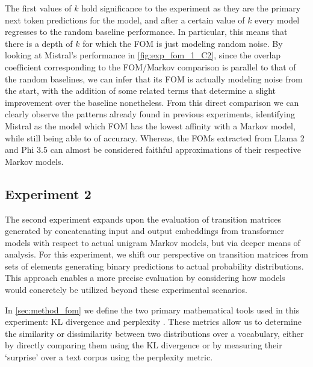 \begin{figure}[t!]
    \centering
    \caption{}
    \label{fig:exp_fom_1_C}
\end{figure}

The first values of $k$ hold  significance to the experiment as they are the primary next token predictions for the model, and after a certain value of $k$ every model regresses to the random baseline performance.
In particular, this means that there is a depth of $k$ for which the FOM is just modeling random noise.
By looking at Mistral's performance in \cref{fig:exp_fom_1_C2}, since the overlap coefficient corresponding to the FOM/Markov comparison is parallel to that of the random baselines, we can infer that its FOM is actually modeling noise from the start, with the addition of some related terms that determine a slight improvement over the baseline nonetheless.
From this direct comparison we can clearly observe the patterns already found in previous experiments, identifying Mistral as the model which FOM has the lowest affinity with a Markov model, while still being able to  of accuracy.
Whereas, the FOMs extracted from Llama 2 and Phi 3.5 can almost be considered faithful approximations of their respective Markov models.

\subsection{Experiment 2}

The second experiment expands upon the evaluation of transition matrices generated by concatenating input and output embeddings from transformer models with respect to actual unigram Markov models, but via deeper means of analysis.
For this experiment, we shift our perspective on transition matrices from sets of elements generating binary predictions to actual probability distributions.
This approach enables a more precise evaluation by considering how models would concretely be utilized beyond these experimental scenarios.

In \cref{sec:method_fom} we define the two primary mathematical tools used in this experiment: KL divergence  and perplexity .
These metrics allow us to determine the similarity or dissimilarity between two distributions over a vocabulary, either by directly comparing them using the KL divergence or by measuring their `surprise' over a text corpus using the perplexity metric. 

